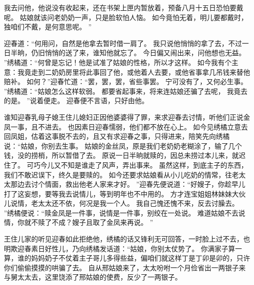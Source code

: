 我去问他，他说没有收起来，还在书架上匣内暂放着，预备八月十五日恐怕要戴呢。
姑娘就该问老奶奶一声，只是脸软怕人恼。
如今竟怕无着，明儿要都戴时，独咱们不戴，是何意思呢。
”\par
迎春道：“何用问，自然是他拿去暂时借一肩了。
我只说他悄悄的拿了去，不过一日半晌，仍旧悄悄的送了来，谁知他就忘了。
今日偏又闹出来，问他想也无益。
”绣橘道：“何曾是忘记！他是试准了姑娘的性格，所以才这样。
如今我有个主意：我竟走到二奶奶房里将此事回了他，或他着人去要，或他省事拿几吊钱来替他赔补。
如何？”迎春忙道：“罢，罢，罢，省些事罢。
宁可没有了，又何必生事。
”绣橘道：“姑娘怎么这样软弱。
都要省起事来，将来连姑娘还骗了去呢，
我竟去的是。
”说着便走。
迎春便不言语，只好由他。
\par
谁知迎春乳母子媳王住儿媳妇正因他婆婆得了罪，来求迎春去讨情，听他们正说金凤一事，且不进去。
也因素日迎春懦弱，他们都不放在心上。
如今见绣橘立意去回凤姐，估着这事脱不去的，且又有求迎春之事，只得进来，陪笑先向绣橘说：“姑娘，你别去生事。
姑娘的金丝凤，原是我们老奶奶老糊涂了，输了几个钱，没的捞梢，所以暂借了去。
原说一日半晌就赎的，因总未捞过本儿来，就迟住了。
可巧今儿又不知是谁走了风声，弄出事来。
虽然这样，到底主子的东西，我们不敢迟误下，终久是要赎的。
如今还要求姑娘看从小儿吃奶的情常，往老太太那边去讨个情面，救出他老人家来才好。
”迎春先便说道：“好嫂子，你趁早儿打了这妄想，要等我去说情儿，等到明年也不中用的。
方才连宝姐姐林妹妹大伙儿说情，老太太还不依，何况是我一个人。
我自己愧还愧不来，反去讨臊去。
”绣橘便说：“赎金凤是一件事，说情是一件事，别绞在一处说。
难道姑娘不去说情，你就不赎了不成？嫂子且取了金凤来再说。
”\par
王住儿家的听见迎春如此拒绝他，绣橘的话又锋利无可回答，一时脸上过不去，也明欺迎春素日好性儿，乃向绣橘发话道：“姑娘，你别太仗势了。
你满家子算一算，谁的妈妈奶子不仗着主子哥儿多得些益，偏咱们就这样丁是丁卯是卯的，只许你们偷偷摸摸的哄骗了去。
自从邢姑娘来了，太太吩咐一个月俭省出一两银子来与舅太太去，这里饶添了邢姑娘的使费，反少了一两银子。
